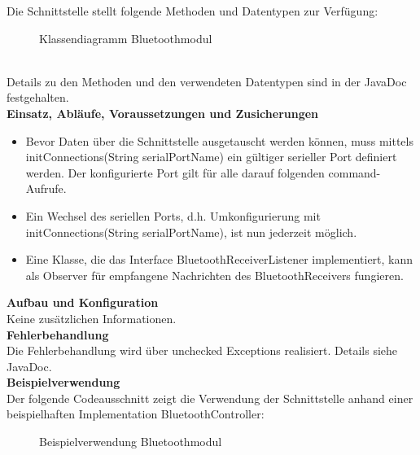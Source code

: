 Die Schnittstelle stellt folgende Methoden und Datentypen zur Verfügung:  \\
\begin{figure}[h!]          
	\centering             
	\caption{Klassendiagramm Bluetoothmodul}
	\label{fig:Klassendiagramm Bluetoothmodul}        
\end{figure} \\
Details zu den Methoden und den verwendeten Datentypen sind in der JavaDoc festgehalten. \\
\textbf{Einsatz, Abläufe, Voraussetzungen und Zusicherungen}\\
\begin{itemize}
	\item{Bevor Daten über die Schnittstelle ausgetauscht werden können, muss mittels initConnections(String serialPortName) ein gültiger serieller Port definiert werden. Der konfigurierte Port gilt für alle darauf folgenden command-Aufrufe. }
	\item{Ein Wechsel des seriellen Ports, d.h. Umkonfigurierung mit initConnections(String serialPortName), ist nun jederzeit möglich.}
	\item{Eine Klasse, die das Interface BluetoothReceiverListener implementiert, kann als Observer für empfangene Nachrichten des BluetoothReceivers fungieren.}
\end{itemize}
\textbf{Aufbau und Konfiguration} \\
Keine zusätzlichen Informationen. \\
\textbf{Fehlerbehandlung}\\
Die Fehlerbehandlung wird über unchecked Exceptions realisiert. Details siehe JavaDoc. \\
\textbf{Beispielverwendung}\\
Der folgende Codeausschnitt zeigt die Verwendung der Schnittstelle anhand einer beispielhaften Implementation BluetoothController: \\
 \begin{figure}[h!]                 
	\caption{Beispielverwendung Bluetoothmodul}
	\label{fig:Beispielverwendung Bluetoothmodul}        
\end{figure}


